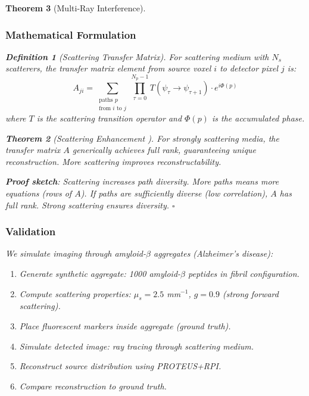 \documentclass[11pt,a4paper]{article}
\newtheorem{theorem}{Theorem}[section]
\newtheorem{definition}[theorem]{Definition}
\begin{document}
\begin{theorem}[Multi-Ray Interference]
\subsubsection{Mathematical Formulation}

\begin{definition}[Scattering Transfer Matrix]
For scattering medium with $N_s$ scatterers, the transfer matrix element from source voxel $i$ to detector pixel $j$ is:
\begin{equation}
A_{ji} = \sum_{\substack{\text{paths } p \\ \text{from } i \text{ to } j}} \prod_{\tau=0}^{N_p-1} T(\psi_\tau \to \psi_{\tau+1}) \cdot e^{i\Phi(p)}
\end{equation}
where $T$ is the scattering transition operator and $\Phi(p)$ is the accumulated phase.
\end{definition}

\begin{theorem}[Scattering Enhancement \cite{Paper11}]
For strongly scattering media, the transfer matrix $A$ generically achieves full rank, guaranteeing unique reconstruction. More scattering improves reconstructability.
\end{theorem}

\textbf{Proof sketch}: Scattering increases path diversity. More paths means more equations (rows of $A$). If paths are sufficiently diverse (low correlation), $A$ has full rank. Strong scattering ensures diversity. $\square$

\subsubsection{Validation}

We simulate imaging through amyloid-$\beta$ aggregates (Alzheimer's disease):
\begin{enumerate}
\item Generate synthetic aggregate: 1000 amyloid-$\beta$ peptides in fibril configuration.
\item Compute scattering properties: $\mu_s = 2.5$ mm$^{-1}$, $g = 0.9$ (strong forward scattering).
\item Place fluorescent markers inside aggregate (ground truth).
\item Simulate detected image: ray tracing through scattering medium.
\item Reconstruct source distribution using PROTEUS+RPI.
\item Compare reconstruction to ground truth.
\end{enumerate}


\end{theorem}
\end{document}
